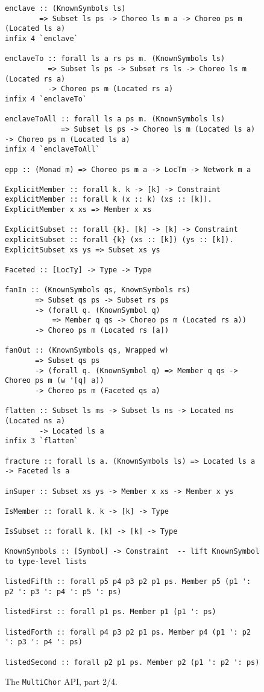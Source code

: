 \documentclass[sigplan,screen,review,anonymous]{acmart}
\newcommand{\MultiChor}{\texttt{Multi\-Chor}\xspace}
\begin{document}
\begin{figure*}\ContinuedFloat
\begin{mdframed}
\begin{verbatim}
enclave :: (KnownSymbols ls)
        => Subset ls ps -> Choreo ls m a -> Choreo ps m (Located ls a)
infix 4 `enclave`

enclaveTo :: forall ls a rs ps m. (KnownSymbols ls)
          => Subset ls ps -> Subset rs ls -> Choreo ls m (Located rs a)
          -> Choreo ps m (Located rs a)
infix 4 `enclaveTo`

enclaveToAll :: forall ls a ps m. (KnownSymbols ls)
             => Subset ls ps -> Choreo ls m (Located ls a) -> Choreo ps m (Located ls a)
infix 4 `enclaveToAll`

epp :: (Monad m) => Choreo ps m a -> LocTm -> Network m a

ExplicitMember :: forall k. k -> [k] -> Constraint
explicitMember :: forall k (x :: k) (xs :: [k]). ExplicitMember x xs => Member x xs

ExplicitSubset :: forall {k}. [k] -> [k] -> Constraint
explicitSubset :: forall {k} (xs :: [k]) (ys :: [k]). ExplicitSubset xs ys => Subset xs ys

Faceted :: [LocTy] -> Type -> Type

fanIn :: (KnownSymbols qs, KnownSymbols rs)
       => Subset qs ps -> Subset rs ps
       -> (forall q. (KnownSymbol q)
           => Member q qs -> Choreo ps m (Located rs a))
       -> Choreo ps m (Located rs [a])

fanOut :: (KnownSymbols qs, Wrapped w)
       => Subset qs ps
       -> (forall q. (KnownSymbol q) => Member q qs -> Choreo ps m (w '[q] a))
       -> Choreo ps m (Faceted qs a)

flatten :: Subset ls ms -> Subset ls ns -> Located ms (Located ns a)
        -> Located ls a
infix 3 `flatten`

fracture :: forall ls a. (KnownSymbols ls) => Located ls a -> Faceted ls a

inSuper :: Subset xs ys -> Member x xs -> Member x ys

IsMember :: forall k. k -> [k] -> Type

IsSubset :: forall k. [k] -> [k] -> Type

KnownSymbols :: [Symbol] -> Constraint  -- lift KnownSymbol to type-level lists

listedFifth :: forall p5 p4 p3 p2 p1 ps. Member p5 (p1 ': p2 ': p3 ': p4 ': p5 ': ps)

listedFirst :: forall p1 ps. Member p1 (p1 ': ps)

listedForth :: forall p4 p3 p2 p1 ps. Member p4 (p1 ': p2 ': p3 ': p4 ': ps)

listedSecond :: forall p2 p1 ps. Member p2 (p1 ': p2 ': ps)
\end{verbatim}
\caption{The \MultiChor API, part 2/4.}
\end{mdframed}
\end{figure*}
\end{document}

